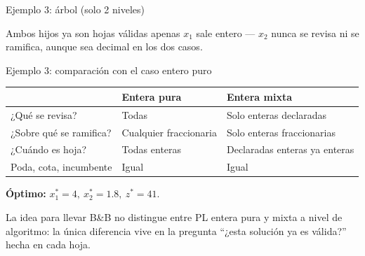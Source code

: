 \documentclass[aspectratio=169]{beamer}
\begin{document}
\begin{frame}{Ejemplo 3: árbol (solo 2 niveles)}
\centering
{}

\vspace{0.3cm}
{\footnotesize Ambos hijos ya son hojas válidas apenas $x_1$ sale entero --- $x_2$ nunca se revisa ni se ramifica, aunque sea decimal en los dos casos.}
\end{frame}

\begin{frame}{Ejemplo 3: comparación con el caso entero puro}
\small
\begin{center}
\renewcommand{\arraystretch}{1.0}
\begin{tabular}{@{}p{4.0cm}p{3.4cm}p{3.4cm}@{}}
\toprule
& \textbf{Entera pura} & \textbf{Entera mixta}\\
\midrule
¿Qué se revisa? & Todas & Solo enteras declaradas\\
¿Sobre qué se ramifica? & Cualquier fraccionaria & Solo enteras fraccionarias\\
¿Cuándo es hoja? & Todas enteras & Declaradas enteras ya enteras\\
Poda, cota, incumbente & Igual & Igual\\
\bottomrule
\end{tabular}
\end{center}
\normalsize

\textbf{Óptimo:} $x_1^\ast=4,\ x_2^\ast=1.8,\ z^\ast=41$.

\begin{alertblock}{La idea para llevar}
\small B\&B no distingue entre PL entera pura y mixta a nivel de algoritmo: la única diferencia vive en la pregunta ``¿esta solución ya es válida?'' hecha en cada hoja.
\normalsize
\end{alertblock}
\end{frame}
\end{document}
